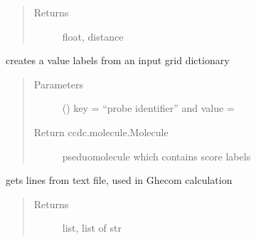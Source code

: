 \documentclass[letterpaper,10pt,english]{sphinxmanual}
\begin{document}
\begin{fulllineitems}
\begin{fulllineitems}
\begin{quote}
\begin{description}
\begin{itemize}
\end{itemize}

\item[{Returns}] \leavevmode
float, distance

\end{description}\end{quote}

\end{fulllineitems}


\begin{fulllineitems}
\label{\detokenize{hs_utilities_api:hotspots.hs_utilities.Helper.get_label}}
creates a value labels from an input grid dictionary
\begin{quote}\begin{description}
\item[{Parameters}] \leavevmode
{} () \textendash{} key = “probe identifier” and value = 

\item[{Return ccdc.molecule.Molecule}] \leavevmode
pseduomolecule which contains score labels

\end{description}\end{quote}

\end{fulllineitems}


\begin{fulllineitems}
\label{\detokenize{hs_utilities_api:hotspots.hs_utilities.Helper.get_lines_from_file}}
gets lines from text file, used in Ghecom calculation
\begin{quote}\begin{description}
\item[{Returns}] \leavevmode
list, list of str


\end{description}
\end{quote}
\end{fulllineitems}
\end{fulllineitems}
\end{document}
